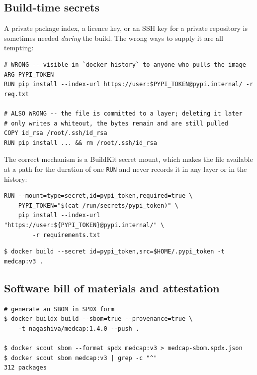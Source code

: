 \documentclass[10pt,a4paper]{article}
\begin{document}
\subsection{Build-time secrets}
\label{sec:secrets}

A private package index, a licence key, or an SSH key for a private
repository is sometimes needed \emph{during} the build. The wrong ways
to supply it are all tempting:

\begin{lstlisting}[style=dfile]
# WRONG -- visible in `docker history` to anyone who pulls the image
ARG PYPI_TOKEN
RUN pip install --index-url https://user:$PYPI_TOKEN@pypi.internal/ -r req.txt

# ALSO WRONG -- the file is committed to a layer; deleting it later
# only writes a whiteout, the bytes remain and are still pulled
COPY id_rsa /root/.ssh/id_rsa
RUN pip install ... && rm /root/.ssh/id_rsa
\end{lstlisting}

The correct mechanism is a BuildKit secret mount, which makes the file
available at a path for the duration of one \texttt{RUN} and never
records it in any layer or in the history:

\begin{lstlisting}[style=dfile]
RUN --mount=type=secret,id=pypi_token,required=true \
    PYPI_TOKEN="$(cat /run/secrets/pypi_token)" \
    pip install --index-url "https://user:${PYPI_TOKEN}@pypi.internal/" \
        -r requirements.txt
\end{lstlisting}

\begin{lstlisting}[style=shell]
$ docker build --secret id=pypi_token,src=$HOME/.pypi_token -t medcap:v3 .
\end{lstlisting}

\subsection{Software bill of materials and attestation}

\begin{lstlisting}[style=shell]
# generate an SBOM in SPDX form
$ docker buildx build --sbom=true --provenance=true \
    -t nagashiva/medcap:1.4.0 --push .

$ docker scout sbom --format spdx medcap:v3 > medcap-sbom.spdx.json
$ docker scout sbom medcap:v3 | grep -c "^"
312 packages
\end{lstlisting}
\end{document}
